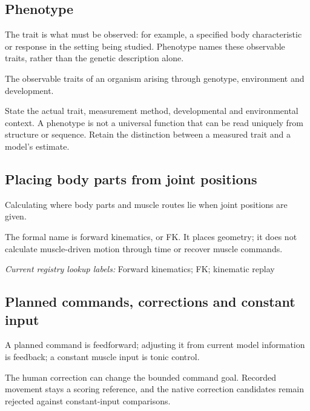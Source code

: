 \subsection*{Phenotype}
\noindent The trait is what must be observed: for example, a specified body characteristic or response in the setting being studied. Phenotype names these observable traits, rather than the genetic description alone.\par
\noindent The observable traits of an organism arising through genotype, environment and development.\par
\noindent State the actual trait, measurement method, developmental and environmental context. A phenotype is not a universal function that can be read uniquely from structure or sequence. Retain the distinction between a measured trait and a model’s estimate.\par

\begin{samepage}
\subsection*{Placing body parts from joint positions}
\noindent Calculating where body parts and muscle routes lie when joint positions are given.\par
\end{samepage}
\begin{samepage}
\noindent The formal name is forward kinematics, or FK. It places geometry; it does not calculate muscle-driven motion through time or recover muscle commands.\par\nopagebreak[4]

\end{samepage}


\noindent\textit{Current registry lookup labels:} Forward kinematics; FK; kinematic replay\par

\begin{samepage}
\subsection*{Planned commands, corrections and constant input}
\noindent A planned command is feedforward; adjusting it from current model information is feedback; a constant muscle input is tonic control.\par
\end{samepage}
\begin{samepage}
\noindent The human correction can change the bounded command goal. Recorded movement stays a scoring reference, and the native correction candidates remain rejected against constant-input comparisons.\par\nopagebreak[4]

\end{samepage}



